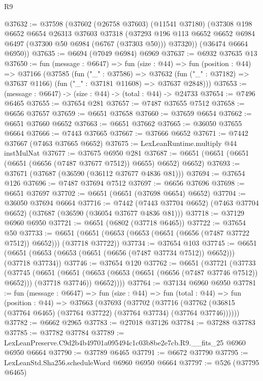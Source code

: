 \begin{lexlean}{R9}
\begin{coremodule}
@37632 := @37598
    (@37602
      (@26758 @37603)
      (@11541 @37180)
      (@37308
        @198
        @6652
        @6654
        @26313
        @37603
        @37318
        (@37293 @196 @113 @6652 @6652 @6984 @6497 (@37300 @50 @6984 (@6767 (@37303 @50))) @37320))
      (@36474 @6664 @6950))
@37635 := @6694 (@7049 @6984) @6969
@37637 := @6932 @37635 @13
@37650 := fun (message : @6647) =>
  fun (size : @44) =>
  fun (position : @44) =>
  @37166
    (@37585
      (fun ("_" : @37586) =>
      @37632 (fun ("_" : @37182) => @37637 @1166) (fun ("_" : @37181 @11608) => @37637 @2848)))
@37653 := (message : @6647) -> (size : @44) -> (total : @44) -> @24733
@37654 := @7496 @6465
@37655 := @37654 @281
@37657 := @7487 @37655 @7512
@37658 := @6656 @37657
@37659 := @6651 @37658
@37660 := @37659 @6654
@37662 := @6651 @37660 @6652
@37663 := @6651 @37662
@37665 := @36050 @37655 @6664
@37666 := @7443 @37665
@37667 := @37666 @6652
@37671 := @7442 @37667 (@7463 @37665 @6652)
@37675 := LexLeanRuntime.multiply @44 instMulNat
@37677 := @37675 @6950 @281
@37687 := @6651 (@6651 (@6651 (@6651 (@6656 (@7487 @37677 @7512)) @6655) @6652) @6652)
@37693 := @37671 (@37687 (@36590 (@36112 @37677 @4836 @81)))
@37694 := @37654 @126
@37696 := @7487 @37694 @7512
@37697 := @6656 @37696
@37698 := @6651 @37697
@37702 := @6651 (@6651 (@37698 @6654) @6652)
@37704 := @36050 @37694 @6664
@37716 := @7442
    (@7443 @37704 @6652)
    (@7463 @37704 @6652)
    (@37687 (@36590 (@36054 @37677 @4836 @81)))
@37718 := @37129 @6960 @6950
@37721 := @6651 (@6802 (@37718 @6465))
@37722 := @37654 @50
@37733 := @6651 (@6651 (@6653 (@6653 (@6651 (@6656 (@7487 @37722 @7512)) @6652))) (@37718 @37722))
@37734 := @37654 @103
@37745 := @6651 (@6651 (@6653 (@6653 (@6651 (@6656 (@7487 @37734 @7512)) @6652))) (@37718 @37734))
@37746 := @37654 @120
@37762 := @6651
    (@37721
      (@37733
        (@37745
          (@6651
            (@6651 (@6653 (@6653 (@6651 (@6656 (@7487 @37746 @7512)) @6652))) (@37718 @37746))
            @6652))))
@37764 := @37134 @6960 @6950
@37781 := fun (message : @6647) =>
  fun (size : @44) =>
  fun (total : @44) =>
  fun (position : @44) =>
  @37663
    (@37693
      (@37702
        (@37716 (@37762 (@36815 (@37764 @6465) (@37764 @37722) (@37764 @37734) (@37764 @37746))))))
@37782 := @6662 @2965
@37783 := @27018 @37126
@37784 := @37288 @37783
@37785 := @37782 @37784
@37789 := LexLeanPreserve.C9d2b4b49701a095494c1c03b8be2e7cb.R9.__fits_25 @6960 @6950 @6664
@37790 := @37789 @6465
@37791 := @6672 @37790
@37795 := LexLeanStd.Sha256.scheduleWord @6960 @6950 @6664
@37797 := @526 (@37795 @6465)

\end{coremodule}
\end{lexlean}
